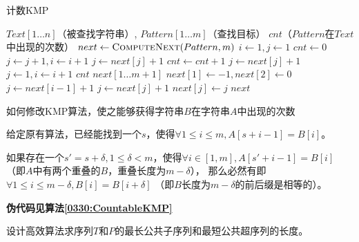\documentclass[answers]{exam}
\begin{document}
\begin{questions}
    \begin{algorithm}[!ht]
        \caption{计数KMP}\label{0330:CountableKMP}
        \begin{algorithmic}[1]
            \Require $Text[1 \dots n]$（被查找字符串）, $Pattern[1 \dots m]$（查找目标）
            \Ensure $cnt$（$Pattern$在$Text$中出现的次数）
            \State $next \gets \Call{ComputeNext}{Pattern, m}$
            \State $i \gets 1, j \gets 1$
            \State $ cnt \gets 0$
            \State $j \gets j+1,i \gets i+1$
            \State $j \gets next[j] + 1$
            \State $cnt \gets cnt + 1$
            \EndIf
            \Else
            \State $j \gets next[j]+1$
            \State $j \gets 1, i \gets i+1$
            \EndIf
            \EndIf
            \EndWhile
            \State \Return $cnt$
            \EndProcedure
            \Statex
            \State $next[1 \dots m+1]$
            \State $next[1] \gets -1, next[2] \gets 0$
            \State $j \gets next[i-1] + 1$
            \State $j \gets next[j] + 1$
            \EndWhile
            \State $next[j] \gets j$
            \EndFor
            \State \Return $next$
            \EndProcedure
        \end{algorithmic}
    \end{algorithm}

    \question 如何修改KMP算法，使之能够获得字符串$B$在字符串$A$中出现的次数

    \begin{solution}
        给定原有算法，已经能找到一个$s$，使得$\forall 1 \leq i \leq m, A[s+i-1] = B[i]$。

        如果存在一个$s' = s + \delta, 1 \leq \delta < m$，使得$\forall i \in [1,m], A[s'+i-1] = B[i]$
        （即$A$中有两个重叠的$B$，重叠长度为$m - \delta$），
        那么必然有即$\forall 1 \leq i \leq m-\delta, B[i] = B[i+\delta]$
        （即$B$长度为$m-\delta$的前后缀是相等的）。

        \textbf{伪代码见算法\ref{0330:CountableKMP}}
    \end{solution}

    \question 设计高效算法求序列$T$和$P$的最长公共子序列和最短公共超序列的长度。
    \begin{parts}

\end{parts}
\end{questions}
\end{document}
